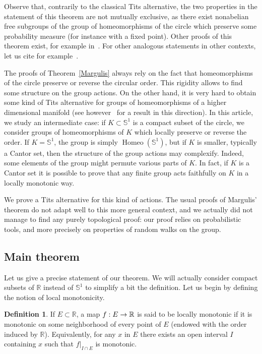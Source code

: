 \documentclass[10pt]{amsart}
\theoremstyle{definition}\newtheorem{defi}[theo]{Definition}\newtheorem{rema}[theo]{Remark}\newtheorem{exam}[theo]{Example}\newtheorem{exem}[theo]{Example}\newtheorem{nota}[theo]{Notation}
\DeclareMathOperator{\Homeo}{Homeo}
\newcommand{\bbS}{\mathbb{S}}
\newcommand{\R}{\mathbb{R}}
\newcounter{setofcase}
\newcounter{case}[setofcase]
\renewcommand*{\to}{\mathchoice{\longrightarrow}{\rightarrow}{\rightarrow}{\rightarrow}}
\begin{document}
Observe that, contrarily to the classical Tits alternative, the two properties in the statement of this theorem are not mutually exclusive, as there exist nonabelian free subgroups of the group of homeomorphisms of the circle which preserve some probability measure (for instance with a fixed point). Other proofs of this theorem exist, for example in~\cite{Ghys,Maly,Nav}. For other analogous statements in other contexts, let us cite for example~\cite{A,BG,HM,MC}.

The proofs of Theorem~\ref{Margulis} always rely on the fact that homeomorphisms of the circle preserve or reverse the circular order. This rigidity allows to find some structure on the group actions. On the other hand, it is very hard to obtain some kind of Tits alternative for groups of homeomorphisms of a higher dimensional manifold (see however~\cite{HX} for a result in this direction). In this article, we study an intermediate case: if $K\subset \bbS^1$ is a compact subset of the circle, we consider groups of homeomorphisms of $K$ which locally preserve or reverse the order. If $K= \bbS^1$, the group is simply $\Homeo(\bbS^1)$, but if $K$ is smaller, typically a Cantor set, then the structure of the group actions may complexify. Indeed, some elements of the group might permute various parts of $K$. In fact, if $K$ is a Cantor set it is possible to prove that any finite group acts faithfully on $K$ in a locally monotonic way.

We prove a Tits alternative for this kind of actions. The usual proofs of Margulis' theorem do not adapt well to this more general context, and we actually did not manage to find any purely topological proof: our proof relies on probabilistic tools, and more precisely on properties of random walks on the group.

\subsection{Main theorem}

Let us give a precise statement of our theorem. We will actually consider compact subsets of $\R$ instead of $\bbS^1$ to simplify a bit the definition. Let us begin by defining the notion of local monotonicity.

\begin{defi}\label{locmon}
If $E\subset \R$, a map $f:E\to \R$ is said to be locally monotonic if it is monotonic on some neighborhood of every point of $E$ (endowed with the order induced by $\R$). Equivalently, for any $x$ in $E$ there exists an open interval $I$ containing $x$ such that $f|_{I\cap E}$ is monotonic.
\end{defi}
\end{document}
